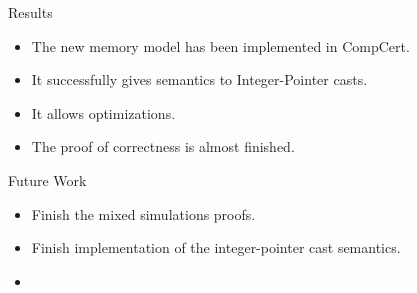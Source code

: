 \begin{frame}{\secname}

  \begin{exampleblock}{Results}
    \begin{itemize}
    \item The new memory model has been implemented in CompCert.
    \item It successfully gives semantics to Integer-Pointer casts.
    \item It allows optimizations.
    \item The proof of correctness is almost finished.
    \end{itemize}
  \end{exampleblock}
  \vfill
  \begin{block}{Future Work}
    \begin{itemize}
    \item Finish the mixed simulations proofs.
    \item Finish implementation of the integer-pointer cast semantics.
    \item {}
    \end{itemize}
  \end{block}
  
\end{frame}


